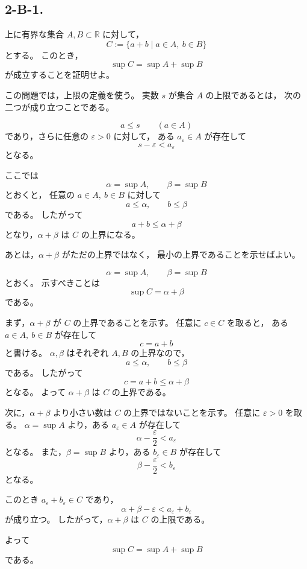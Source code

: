 \subsection{2-B-1.}
\begin{exercise}
	上に有界な集合 \(A,B\subset\mathbb{R}\) に対して，
	\[
	C:=\{a+b\mid a\in A,\ b\in B\}
	\]
	とする。
	このとき，
	\[
	\sup C=\sup A+\sup B
	\]
	が成立することを証明せよ。
\end{exercise}

\begin{background}
	この問題では，上限の定義を使う。
	実数 \(s\) が集合 \(A\) の上限であるとは，
	次の二つが成り立つことである。
	
	\[
	a\leq s
	\qquad (a\in A)
	\]
	であり，さらに任意の \(\varepsilon>0\) に対して，
	ある \(a_\varepsilon\in A\) が存在して
	\[
	s-\varepsilon<a_\varepsilon
	\]
	となる。
	
	ここでは
	\[
	\alpha=\sup A,
	\qquad
	\beta=\sup B
	\]
	とおくと，
	任意の \(a\in A,\ b\in B\) に対して
	\[
	a\leq\alpha,
	\qquad
	b\leq\beta
	\]
	である。
	したがって
	\[
	a+b\leq\alpha+\beta
	\]
	となり，\(\alpha+\beta\) は \(C\) の上界になる。
	
	あとは，\(\alpha+\beta\) がただの上界ではなく，
	最小の上界であることを示せばよい。
\end{background}

\begin{strategy}
	\[
	\alpha=\sup A,
	\qquad
	\beta=\sup B
	\]
	とおく。
	示すべきことは
	\[
	\sup C=\alpha+\beta
	\]
	である。
	
	まず，\(\alpha+\beta\) が \(C\) の上界であることを示す。
	任意に \(c\in C\) を取ると，
	ある \(a\in A,\ b\in B\) が存在して
	\[
	c=a+b
	\]
	と書ける。
	\(\alpha,\beta\) はそれぞれ \(A,B\) の上界なので，
	\[
	a\leq\alpha,
	\qquad
	b\leq\beta
	\]
	である。
	したがって
	\[
	c=a+b\leq\alpha+\beta
	\]
	となる。
	よって \(\alpha+\beta\) は \(C\) の上界である。
	
	次に，\(\alpha+\beta\) より小さい数は
	\(C\) の上界ではないことを示す。
	任意に \(\varepsilon>0\) を取る。
	\(\alpha=\sup A\) より，ある \(a_\varepsilon\in A\) が存在して
	\[
	\alpha-\frac{\varepsilon}{2}<a_\varepsilon
	\]
	となる。
	また，\(\beta=\sup B\) より，ある \(b_\varepsilon\in B\) が存在して
	\[
	\beta-\frac{\varepsilon}{2}<b_\varepsilon
	\]
	となる。
	
	このとき \(a_\varepsilon+b_\varepsilon\in C\) であり，
	\[
	\alpha+\beta-\varepsilon
	<
	a_\varepsilon+b_\varepsilon
	\]
	が成り立つ。
	したがって，\(\alpha+\beta\) は \(C\) の上限である。
	
	よって
	\[
	\sup C=\sup A+\sup B
	\]
	である。
\end{strategy}